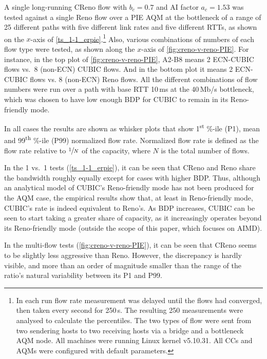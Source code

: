 A single long-running CReno flow with \(b_c = 0.7\) and AI factor \(a_c=1.53\) was tested against a single Reno flow over a PIE AQM at the bottleneck of a range of 25 different paths with five different link rates and five different RTTs, as shown on the \(x\)-axis of \autoref{ts_1-1_erpie}.\footnote{In each run flow rate measurement was delayed until the flows had converged, then taken every second for 250\,s. The resulting 250 measurements were analysed to calculate the percentiles. The two types of flow were sent from two sendering hosts to two receiving hosts via a bridge and a bottleneck AQM node. All machines were running Linux kernel v5.10.31. All CCs and AQMs were configured with default parameters.} Also, various combinations of numbers of each flow type were tested, as shown along the \(x\)-axis of \autoref{fig:creno-v-reno-PIE}. For instance, in the top plot of \autoref{fig:creno-v-reno-PIE}, A2-B8 means 2 ECN-CUBIC flows vs.\ 8 (non-ECN) CUBIC flows. And in the bottom plot it means 2 ECN-CUBIC flows vs. 8 (non-ECN) Reno flows. All the different combinations of flow numbers were run over a path with base RTT 10\,ms at the 40\,Mb/s bottleneck, which was chosen to have low enough BDP for CUBIC to remain in its Reno-friendly mode. 

In all cases the results are shown as whisker plots that show 1\textsuperscript{st} \%-ile (P1), mean and 99\textsuperscript{th} \%-ile (P99) normalized flow rate. Normalized flow rate is defined as the flow rate relative to \(\sfrac{1}{N}\) of the capacity, where \(N\) is the total number of flows.

In the 1 vs.\ 1 tests (\autoref{ts_1-1_erpie}), it can be seen that CReno and Reno share the bandwidth roughly equally except for cases with higher BDP. Thus, although an analytical model of CUBIC's Reno-friendly mode has not been produced for the AQM case, the empirical results show that, at least in Reno-friendly mode, CUBIC's rate is indeed equivalent to Reno's. As BDP increases, CUBIC can be seen to start taking a greater share of capacity, as it increasingly operates beyond its Reno-friendly mode (outside the scope of this paper, which focuses on AIMD). 

In the multi-flow tests (\autoref{fig:creno-v-reno-PIE}), it can be seen that CReno seems to be slightly less aggressive than Reno. However, the discrepancy is hardly visible, and more than an order of magnitude smaller than the range of the ratio's natural variability between its P1 and P99.


